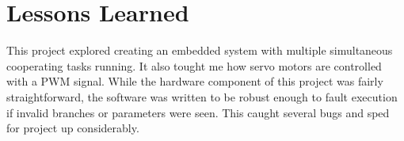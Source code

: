 \documentclass[CMPE]{KGCOEReport}
\begin{document}
    \section*{Lessons Learned}

	This project explored creating an embedded system with multiple simultaneous
	cooperating tasks running. It also tought me how servo motors are controlled
	with a PWM signal. While the hardware component of this project was fairly
	straightforward, the software was written to be robust enough to fault
	execution if invalid branches or parameters were seen. This caught several
	bugs and sped for project up considerably.
\end{document}
